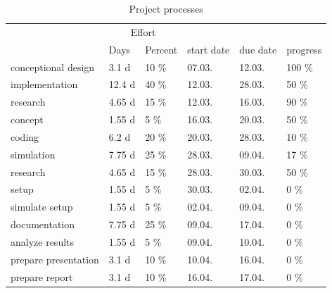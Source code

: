 \documentclass[a4paper,10pt]{article}
\begin{document}
\begin{table}[h]
\centering
\caption{Project processes}
\label{tab:project_processes}
\begin{tabular}{llllll}
\rowcolor[HTML]{EFEFEF} 
\cellcolor[HTML]{EFEFEF}                          & \multicolumn{2}{c}{\cellcolor[HTML]{EFEFEF}Effort} & \cellcolor[HTML]{EFEFEF}                             & \cellcolor[HTML]{EFEFEF}             &      \\
\rowcolor[HTML]{EFEFEF} 
\multirow{-2}{*}{\cellcolor[HTML]{EFEFEF}Process} & Days                  & Percent                   & \multirow{-2}{*}{\cellcolor[HTML]{EFEFEF}start date} & \multirow{-2}{*}{\cellcolor[HTML]{EFEFEF}due date} & \multirow{-2}{*}{\cellcolor[HTML]{EFEFEF}progress} \\
conceptional design                               & 3.1 d   & 10 \%  & 07.03. & 12.03. & 100 \% \\
implementation                                    & 12.4 d  & 40 \%  & 12.03. & 28.03. & 50 \% \\
\hspace{0.5cm}research                            & 4.65 d  & 15 \%  & 12.03. & 16.03. & 90 \% \\
\hspace{0.5cm}concept                             & 1.55 d  & 5 \%   & 16.03. & 20.03. & 50 \% \\
\hspace{0.5cm}coding                              & 6.2 d   & 20 \%  & 20.03. & 28.03. & 10 \% \\
simulation                                        & 7.75 d  & 25 \%  & 28.03. & 09.04. & 17 \% \\
\hspace{0.5cm}research                            & 4.65 d  & 15 \%  & 28.03. & 30.03. & 50 \% \\
\hspace{0.5cm}setup                               & 1.55 d  & 5 \%   & 30.03. & 02.04. & 0 \% \\
\hspace{0.5cm}simulate setup                      & 1.55 d  & 5 \%   & 02.04. & 09.04. & 0 \% \\
documentation                                     & 7.75 d  & 25 \%  & 09.04. & 17.04. & 0 \% \\
\hspace{0.5cm}analyze results                     & 1.55 d  & 5 \%   & 09.04. & 10.04. & 0 \% \\
\hspace{0.5cm}prepare presentation                & 3.1 d   & 10 \%  & 10.04. & 16.04. & 0 \% \\
\hspace{0.5cm}prepare report                      & 3.1 d   & 10 \%  & 16.04. & 17.04. & 0 \% \\
\end{tabular}
\end{table}
\end{document}
